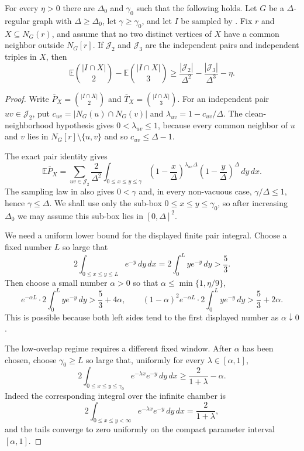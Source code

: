 \begin{lemma}
For every $\eta>0$ there are $\Delta_0$ and $\gamma_0$ such that the
following holds.  Let $G$ be a $\Delta$-regular graph with
$\Delta\ge\Delta_0$, let $\gamma\ge\gamma_0$, and let $I$ be sampled by
.  Fix $r$ and
$X\subseteq N_G(r)$, and assume that no two distinct vertices of $X$ have a
common neighbor outside $N_G[r]$.  If $\mathcal J_2$ and $\mathcal J_3$ are
the independent pairs and independent triples in $X$, then
\[
\mathbb E\binom{|I\cap X|}{2}
-\mathbb E\binom{|I\cap X|}{3}
\ge
\frac{|\mathcal J_2|}{\Delta^2}
-\frac{|\mathcal J_3|}{\Delta^3}
-\eta .
\]
\end{lemma}
\begin{proof}
Write $\overline P_X=\binom{|I\cap X|}{2}$ and
$\overline T_X=\binom{|I\cap X|}{3}$.  For an independent pair
$uv\in\mathcal J_2$, put
$c_{uv}=|N_G(u)\cap N_G(v)|$ and
$\lambda_{uv}=1-c_{uv}/\Delta$.  The clean-neighborhood hypothesis gives
$0<\lambda_{uv}\le1$, because every common neighbor of $u$ and $v$ lies in
$N_G[r]\setminus\{u,v\}$ and so $c_{uv}\le\Delta-1$.

The exact pair identity  gives
\[
\mathbb E\overline P_X
=\sum_{uv\in\mathcal J_2}
\frac{2}{\Delta^2}
\int_{0\le x\le y\le\gamma}
\left(1-\frac{x}{\Delta}\right)^{\lambda_{uv}\Delta}
\left(1-\frac{y}{\Delta}\right)^\Delta\,dy\,dx .
\]
The sampling law in  also gives
$0<\gamma$ and, in every non-vacuous case, $\gamma/\Delta\le1$, hence
$\gamma\le\Delta$.  We shall use only the sub-box
$0\le x\le y\le\gamma_0$, so after increasing $\Delta_0$ we may assume this
sub-box lies in $[0,\Delta]^2$.

We need a uniform lower bound for the displayed finite pair integral.  Choose
a fixed number $L$ so large that
\[
2\int_{0\le x\le y\le L} e^{-y}\,dy\,dx
=2\int_0^L y e^{-y}\,dy
> \frac53 .
\]
Then choose a small number $\alpha>0$ so that
$\alpha\le\min\{1,\eta/9\}$,
\[
e^{-\alpha L}\cdot
2\int_0^L y e^{-y}\,dy
> \frac53+4\alpha ,
\qquad
(1-\alpha)^2 e^{-\alpha L}\cdot
2\int_0^L y e^{-y}\,dy
> \frac53+2\alpha .
\]
This is possible because both left sides tend to the first displayed number
as $\alpha\downarrow0$.

The low-overlap regime requires a different fixed window.  After $\alpha$
has been chosen, choose $\gamma_0\ge L$ so large that, uniformly for every
$\lambda\in[\alpha,1]$,
\[
2\int_{0\le x\le y\le\gamma_0} e^{-\lambda x}e^{-y}\,dy\,dx
\ge
\frac{2}{1+\lambda}-\alpha .
\]
Indeed the corresponding integral over the infinite chamber is
\[
2\int_{0\le x\le y<\infty} e^{-\lambda x}e^{-y}\,dy\,dx
=\frac{2}{1+\lambda},
\]
and the tails converge to zero uniformly on the compact parameter interval
$[\alpha,1]$.


\end{proof}
